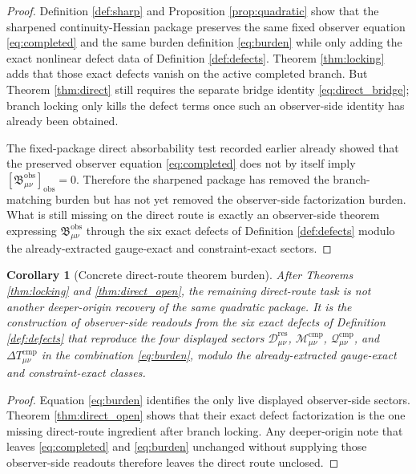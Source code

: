 \documentclass[11pt]{article}
\newcommand{\ResidualDec}{\mathcal D_{\mu\nu}^{\mathrm{res}}}
\newcommand{\CompMix}{\mathcal M_{\mu\nu}^{\mathrm{cmp}}}
\newcommand{\CompQuad}{\mathcal Q_{\mu\nu}^{\mathrm{cmp}}}
\newcommand{\DeltaTComp}{\Delta T_{\mu\nu}^{\mathrm{cmp}}}
\newcommand{\ObsBurden}{\mathfrak B_{\mu\nu}^{\mathrm{obs}}}
\newcommand{\ObserverClass}[1]{\left[#1\right]_{\mathrm{obs}}}
\newtheorem{corollary}{Corollary}
\begin{document}
\begin{proof}
Definition \ref{def:sharp} and Proposition \ref{prop:quadratic} show that the sharpened continuity-Hessian package preserves the same fixed observer equation \eqref{eq:completed} and the same burden definition \eqref{eq:burden} while only adding the exact nonlinear defect data of Definition \ref{def:defects}. Theorem \ref{thm:locking} adds that those exact defects vanish on the active completed branch. But Theorem \ref{thm:direct} still requires the separate bridge identity \eqref{eq:direct_bridge}; branch locking only kills the defect terms once such an observer-side identity has already been obtained.

The fixed-package direct absorbability test recorded earlier already showed that the preserved observer equation \eqref{eq:completed} does not by itself imply \(\ObserverClass{\ObsBurden}=0\). Therefore the sharpened package has removed the branch-matching burden but has not yet removed the observer-side factorization burden. What is still missing on the direct route is exactly an observer-side theorem expressing \(\ObsBurden\) through the six exact defects of Definition \ref{def:defects} modulo the already-extracted gauge-exact and constraint-exact sectors.
\end{proof}

\begin{corollary}[Concrete direct-route theorem burden]
\label{cor:direct_concrete}
After Theorems \ref{thm:locking} and \ref{thm:direct_open}, the remaining direct-route task is not another deeper-origin recovery of the same quadratic package. It is the construction of observer-side readouts from the six exact defects of Definition \ref{def:defects} that reproduce the four displayed sectors \(\ResidualDec\), \(\CompMix\), \(\CompQuad\), and \(\DeltaTComp\) in the combination \eqref{eq:burden}, modulo the already-extracted gauge-exact and constraint-exact classes.
\end{corollary}

\begin{proof}
Equation \eqref{eq:burden} identifies the only live displayed observer-side sectors. Theorem \ref{thm:direct_open} shows that their exact defect factorization is the one missing direct-route ingredient after branch locking. Any deeper-origin note that leaves \eqref{eq:completed} and \eqref{eq:burden} unchanged without supplying those observer-side readouts therefore leaves the direct route unclosed.
\end{proof}
\end{document}
